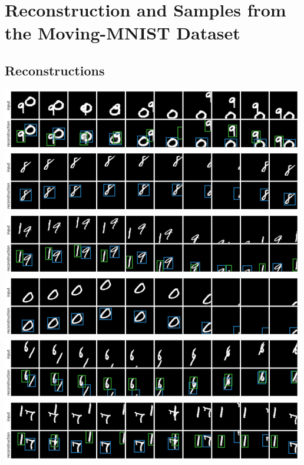 \section{Reconstruction and Samples from the Moving-MNIST Dataset}
\label{app:mnist_visual}


\subsection{Reconstructions}
\begin{center}

    \includegraphics[width=\linewidth]{figures/SQAIR/mnist_rec/000047.png}
    \includegraphics[width=\linewidth]{figures/SQAIR/mnist_rec/000050.png}
    \includegraphics[width=\linewidth]{figures/SQAIR/mnist_rec/000070.png}
    \includegraphics[width=\linewidth]{figures/SQAIR/mnist_rec/000074.png}
    \includegraphics[width=\linewidth]{figures/SQAIR/mnist_rec/000087.png}
    \includegraphics[width=\linewidth]{figures/SQAIR/mnist_rec/000088.png}

\end{center}
